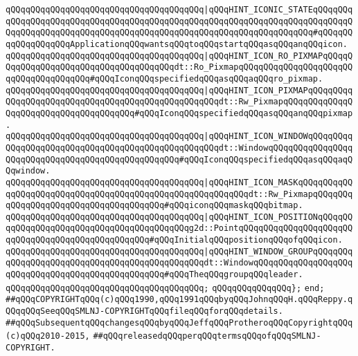 \verb|qQQqqQQqqQQqqQQqqQQqqQQqqQQqqQQqqQQqqQQq|\verb#|qQQqHINT_ICONIC_STATEqQQqqQQqqQQqqQQqqQQqqQQqqQQqqQQqqQQqqQQqqQQqqQQqqQQqqQQqqQQqqQQqqQQqqQQqqQQqqQQqqQQqqQQqqQQqqQQqqQQqqQQqqQQqqQQqqQQqqQQqqQQqqQQqqQQqqQQqqQQq#\verb|#qQQqqQQqqQQqqQQqqQQqApplicationqQQqwantsqQQqtoqQQqstartqQQqasqQQqanqQQqicon.|\newline
\verb|qQQqqQQqqQQqqQQqqQQqqQQqqQQqqQQqqQQqqQQq|\verb#|qQQqHINT_ICON_RO_PIXMAPqQQqqQQqqQQqqQQqqQQqqQQqqQQqqQQqqQQqqQQqdt::Ro_PixmapqQQqqQQqqQQqqQQqqQQqqQQqqQQqqQQqqQQqqQQq#\verb|#qQQqIconqQQqspecifiedqQQqasqQQqaqQQqro_pixmap.|\newline
\verb|qQQqqQQqqQQqqQQqqQQqqQQqqQQqqQQqqQQqqQQq|\verb#|qQQqHINT_ICON_PIXMAPqQQqqQQqqQQqqQQqqQQqqQQqqQQqqQQqqQQqqQQqqQQqqQQqqQQqdt::Rw_PixmapqQQqqQQqqQQqqQQqqQQqqQQqqQQqqQQqqQQqqQQq#\verb|#qQQqIconqQQqspecifiedqQQqasqQQqanqQQqpixmap.|\newline
\verb|qQQqqQQqqQQqqQQqqQQqqQQqqQQqqQQqqQQqqQQq|\verb#|qQQqHINT_ICON_WINDOWqQQqqQQqqQQqqQQqqQQqqQQqqQQqqQQqqQQqqQQqqQQqqQQqqQQqdt::WindowqQQqqQQqqQQqqQQqqQQqqQQqqQQqqQQqqQQqqQQqqQQqqQQqqQQq#\verb|#qQQqIconqQQqspecifiedqQQqasqQQqaqQQqwindow.|\newline
\verb|qQQqqQQqqQQqqQQqqQQqqQQqqQQqqQQqqQQqqQQq|\verb#|qQQqHINT_ICON_MASKqQQqqQQqqQQqqQQqqQQqqQQqqQQqqQQqqQQqqQQqqQQqqQQqqQQqqQQqqQQqdt::Rw_PixmapqQQqqQQqqQQqqQQqqQQqqQQqqQQqqQQqqQQqqQQq#\verb|#qQQqiconqQQqmaskqQQqbitmap.|\newline
\verb|qQQqqQQqqQQqqQQqqQQqqQQqqQQqqQQqqQQqqQQq|\verb#|qQQqHINT_ICON_POSITIONqQQqqQQqqQQqqQQqqQQqqQQqqQQqqQQqqQQqqQQqqQQqg2d::PointqQQqqQQqqQQqqQQqqQQqqQQqqQQqqQQqqQQqqQQqqQQqqQQqqQQq#\verb|#qQQqInitialqQQqpositionqQQqofqQQqicon.|\newline
\verb|qQQqqQQqqQQqqQQqqQQqqQQqqQQqqQQqqQQqqQQq|\verb#|qQQqHINT_WINDOW_GROUPqQQqqQQqqQQqqQQqqQQqqQQqqQQqqQQqqQQqqQQqqQQqqQQqdt::WindowqQQqqQQqqQQqqQQqqQQqqQQqqQQqqQQqqQQqqQQqqQQqqQQqqQQq#\verb|#qQQqTheqQQqgroupqQQqleader.|\newline
\verb|qQQqqQQqqQQqqQQqqQQqqQQqqQQqqQQqqQQqqQQq;|\newline
\newline
\verb|qQQqqQQqqQQqqQQq};|\newline
\newline
\verb|end;|\newline
\newline
\newline
\verb|##qQQqCOPYRIGHTqQQq(c)qQQq1990,qQQq1991qQQqbyqQQqJohnqQQqH.qQQqReppy.qQQqqQQqSeeqQQqSMLNJ-COPYRIGHTqQQqfileqQQqforqQQqdetails.|\newline
\verb|##qQQqSubsequentqQQqchangesqQQqbyqQQqJeffqQQqProtheroqQQqCopyrightqQQq(c)qQQq2010-2015,|\newline
\verb|##qQQqreleasedqQQqperqQQqtermsqQQqofqQQqSMLNJ-COPYRIGHT.|\newline

